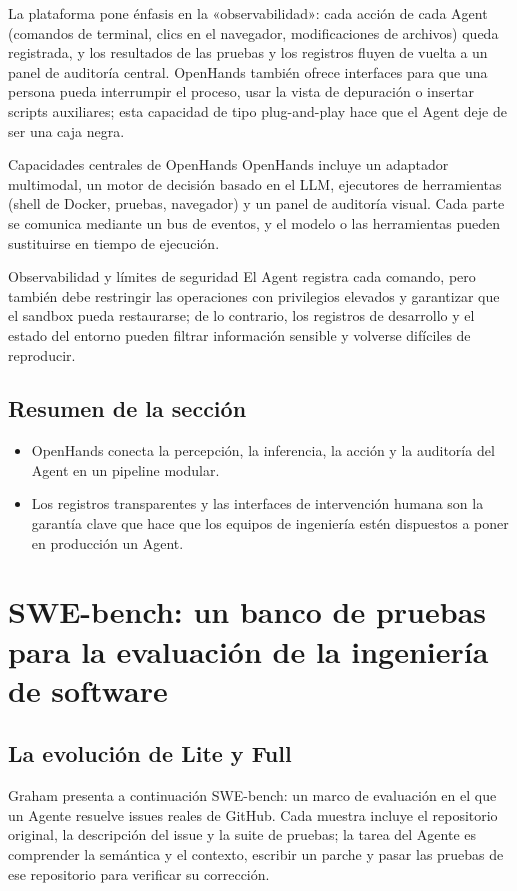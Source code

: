 \documentclass[a4paper]{article}
\begin{document}
La plataforma pone énfasis en la «observabilidad»: cada acción de cada Agent (comandos de terminal, clics en el navegador, modificaciones de archivos) queda registrada, y los resultados de las pruebas y los registros fluyen de vuelta a un panel de auditoría central. OpenHands también ofrece interfaces para que una persona pueda interrumpir el proceso, usar la vista de depuración o insertar scripts auxiliares; esta capacidad de tipo plug-and-play hace que el Agent deje de ser una caja negra.

\begin{knowledgebox}{Capacidades centrales de OpenHands}
OpenHands incluye un adaptador multimodal, un motor de decisión basado en el LLM, ejecutores de herramientas (shell de Docker, pruebas, navegador) y un panel de auditoría visual. Cada parte se comunica mediante un bus de eventos, y el modelo o las herramientas pueden sustituirse en tiempo de ejecución.
\end{knowledgebox}

\begin{warningbox}{Observabilidad y límites de seguridad}
El Agent registra cada comando, pero también debe restringir las operaciones con privilegios elevados y garantizar que el sandbox pueda restaurarse; de lo contrario, los registros de desarrollo y el estado del entorno pueden filtrar información sensible y volverse difíciles de reproducir.
\end{warningbox}

\subsection{Resumen de la sección}
\begin{itemize}
    \item OpenHands conecta la percepción, la inferencia, la acción y la auditoría del Agent en un pipeline modular.
    \item Los registros transparentes y las interfaces de intervención humana son la garantía clave que hace que los equipos de ingeniería estén dispuestos a poner en producción un Agent.
\end{itemize}
\section{SWE-bench: un banco de pruebas para la evaluación de la ingeniería de software}
\subsection{La evolución de Lite y Full}
Graham presenta a continuación SWE-bench: un marco de evaluación en el que un Agente resuelve issues reales de GitHub. Cada muestra incluye el repositorio original, la descripción del issue y la suite de pruebas; la tarea del Agente es comprender la semántica y el contexto, escribir un parche y pasar las pruebas de ese repositorio para verificar su corrección.
\end{document}
